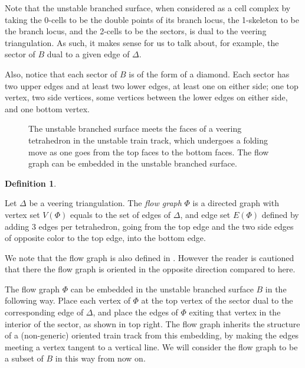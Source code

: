 \documentclass[12pt]{amsart}
\theoremstyle{definition}
\newtheorem{defn}[thm]{Definition}
\numberwithin{equation}{section}
\begin{document}
Note that the unstable branched surface, when considered as a cell complex by taking the 0-cells to be the double points of its branch locus, the 1-skeleton to be the branch locus, and the 2-cells to be the sectors, is dual to the veering triangulation. As such, it makes sense for us to talk about, for example, the sector of $B$ dual to a given edge of $\Delta$.

Also, notice that each sector of $B$ is of the form of a diamond. Each sector has two upper edges and at least two lower edges, at least one on either side; one top vertex, two side vertices, some vertices between the lower edges on either side, and one bottom vertex.

\begin{figure} 
    \centering
    \resizebox{!}{8cm}{}
    \caption{The unstable branched surface meets the faces of a veering tetrahedron in the unstable train track, which undergoes a folding move as one goes from the top faces to the bottom faces. The flow graph can be embedded in the unstable branched surface.}
    \label{fig:branchsurf}
\end{figure}

\begin{defn} \label{defn:flowgraph}

Let $\Delta$ be a veering triangulation. The \textit{flow graph} $\Phi$ is a directed graph with vertex set $V(\Phi)$ equals to the set of edges of $\Delta$, and edge set $E(\Phi)$ defined by adding 3 edges per tetrahedron, going from the top edge and the two side edges of opposite color to the top edge, into the bottom edge.

\end{defn}

We note that the flow graph is also defined in \cite{LMT20}. However the reader is cautioned that there the flow graph is oriented in the opposite direction compared to here.

The flow graph $\Phi$ can be embedded in the unstable branched surface $B$ in the following way. Place each vertex of $\Phi$ at the top vertex of the sector dual to the corresponding edge of $\Delta$, and place the edges of $\Phi$ exiting that vertex in the interior of the sector, as shown in  top right. The flow graph inherits the structure of a (non-generic) oriented train track from this embedding, by making the edges meeting a vertex tangent to a vertical line. We will consider the flow graph to be a subset of $B$ in this way from now on.
\end{document}
